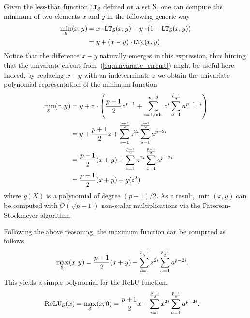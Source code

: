  Given the less-than function $\LT_\S$ defined on a set $\S$, one can compute the minimum of two elements $x$ and $y$ in the following generic way
  \begin{align*}
    \min_\S(x,y) &= x \cdot \LT_\S(x,y) + y \cdot (1 - \LT_\S(x,y)) \\
    &= y + (x-y) \cdot \LT_\S(x,y)
  \end{align*}
  Notice that the difference $x - y$ naturally emerges in this expression, thus hinting that the univariate circuit from~(\ref{eq:univariate_circuit}) might be useful here.
  Indeed, by replacing $x - y$ with an indeterminate $z$ we obtain the univariate polynomial representation of the minimum function 
  \begin{align*}
    \min_\S(x,y) & = y + z \cdot \left(\frac{p+1}{2} z^{p-1} + \sum_{i=1, \text{odd}}^{p-2} z^i \sum_{a=1}^{\frac{p-1}{2}} a^{p-1-i}\right) \\
    & = y + \frac{p+1}{2} z + \sum_{i=1}^{\frac{p-1}{2}} z^{2i} \sum_{a=1}^{\frac{p-1}{2}} a^{p-2i} \\
    & = \frac{p+1}{2} (x+y) + \sum_{i=1}^{\frac{p-1}{2}} z^{2i} \sum_{a=1}^{\frac{p-1}{2}} a^{p-2i} \\
    & = \frac{p+1}{2} (x+y) + g(z^2)
  \end{align*}
  where $g(X)$ is a polynomial of degree $(p-1)/2$. 
  As a result, $\min(x,y)$ can be computed with $O(\sqrt{p-1})$ non-scalar multiplications via the Paterson-Stockmeyer algorithm.

  Following the above reasoning, the maximum function can be computed as follows
  \begin{align*}
    \max_\S(x,y) &= \frac{p+1}{2} (x+y) - \sum_{i=1}^{\frac{p-1}{2}} z^{2i} \sum_{a=1}^{\frac{p-1}{2}} a^{p-2i}.
  \end{align*}
   This yields a simple polynomial for the ReLU function.
  \begin{align*}
    \ReLU_\S(x) = \max_\S(x,0) &= \frac{p+1}{2} x - \sum_{i=1}^{\frac{p-1}{2}} x^{2i} \sum_{a=1}^{\frac{p-1}{2}} a^{p-2i}.
  \end{align*}

